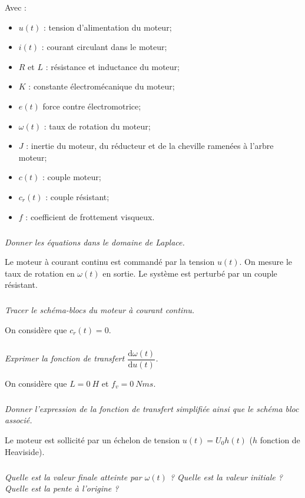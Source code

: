 \documentclass[10pt,fleqn]{article} %
\begin{document}
\begin{multicols}{2}
Avec :
\begin{itemize}
\item $u(t)$ : tension d'alimentation du moteur;
\item $i(t)$ : courant circulant dans le moteur;
\item $R$ et $L$ : résistance et inductance du moteur;
\item $K$ : constante électromécanique du moteur;
\item $e(t)$ force contre électromotrice;
\item $\omega(t)$ : taux de rotation du moteur;
\item $J$ : inertie du moteur, du réducteur et de la cheville ramenées à l'arbre moteur;
\item $c(t)$ : couple moteur; 
\item $c_r(t)$ : couple résistant; 
\item $f$ : coefficient de frottement visqueux.
\end{itemize}



\subparagraph{}\textit{Donner les équations dans le domaine de Laplace.}

\vspace{.25cm}

Le moteur à courant continu est commandé par la tension $u(t)$. On mesure le taux de rotation en $\omega(t)$ en sortie. Le système est perturbé par un couple résistant. 

\subparagraph{}\textit{Tracer le schéma-blocs du moteur à courant continu.}

\vspace{.25cm}

On considère que $c_r(t)=0$.

\subparagraph{}\textit{Exprimer la fonction de transfert $\dfrac{\text{d}\omega(t)}{\text{d}u(t)}$.}


\vspace{.25cm}

On considère que $L=\SI{0}{H}$ et $f_v=\SI{0}{Nms}$.

\subparagraph{}\textit{Donner l'expression de la fonction de transfert simplifiée ainsi que le schéma bloc associé.}


Le moteur est sollicité par un échelon de tension $u(t)=U_0 h(t)$ ($h$ fonction de Heaviside).

\subparagraph{}\textit{Quelle est la valeur finale atteinte par $\omega(t)$ ? Quelle est la valeur initiale ? Quelle est la pente à l'origine ?}


\end{multicols}
\end{document}
